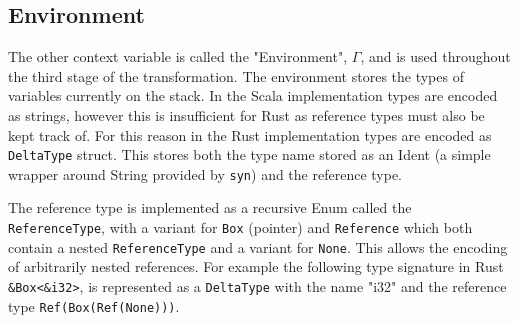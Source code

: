 \documentclass[ oneside,%
                    author={James Elgar},
                    degree={MEng},
                     title={Bidirectional transformer between functional and \\ object-oriented programming in Rust},
                  subtitle={}]{dissertation}
\newcommand{\rust}[1]{\texttt{#1}}
\begin{document}

\subsection{Environment}

The other context variable is called the "Environment", $\Gamma$, and is used throughout the third stage of the transformation. The environment stores the types of variables currently on the stack. 
In the Scala implementation types are encoded as strings, however this is insufficient for Rust as reference types must also be kept track of. For this reason in the Rust implementation types are encoded as \verb|DeltaType| struct. 
This stores both the type name stored as an Ident (a simple wrapper around String provided by \verb|syn|) and the reference type.

The reference type is implemented as a recursive Enum called the \verb|ReferenceType|, with a variant for \verb|Box| (pointer) and \verb|Reference| which both contain a nested \verb|ReferenceType| and a variant for \verb|None|. This allows the encoding of arbitrarily nested references. For example the following type signature in Rust \rust{&Box<&i32>}, is represented as a \verb|DeltaType| with the name "i32" and the reference type \verb|Ref(Box(Ref(None)))|.



\end{document}
